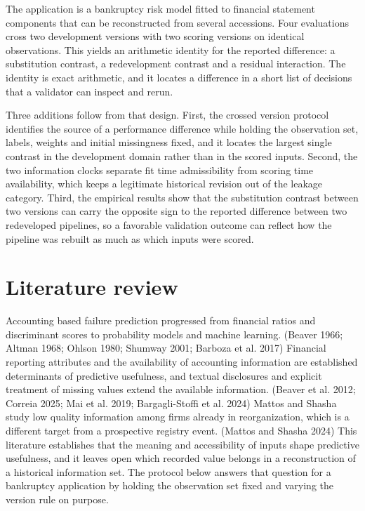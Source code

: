 \documentclass[10pt,a4paper,twocolumn]{article}
\begin{document}
The application is a bankruptcy risk model fitted to financial statement components that can be reconstructed from several accessions. Four evaluations cross two development versions with two scoring versions on identical observations. This yields an arithmetic identity for the reported difference: a substitution contrast, a redevelopment contrast and a residual interaction. The identity is exact arithmetic, and it locates a difference in a short list of decisions that a validator can inspect and rerun.

Three additions follow from that design. First, the crossed version protocol identifies the source of a performance difference while holding the observation set, labels, weights and initial missingness fixed, and it locates the largest single contrast in the development domain rather than in the scored inputs. Second, the two information clocks separate fit time admissibility from scoring time availability, which keeps a legitimate historical revision out of the leakage category. Third, the empirical results show that the substitution contrast between two versions can carry the opposite sign to the reported difference between two redeveloped pipelines, so a favorable validation outcome can reflect how the pipeline was rebuilt as much as which inputs were scored.
\section{Literature review}
Accounting based failure prediction progressed from financial ratios and discriminant scores to probability models and machine learning. (Beaver 1966; Altman 1968; Ohlson 1980; Shumway 2001; Barboza et al. 2017) Financial reporting attributes and the availability of accounting information are established determinants of predictive usefulness, and textual disclosures and explicit treatment of missing values extend the available information. (Beaver et al. 2012; Correia 2025; Mai et al. 2019; Bargagli-Stoffi et al. 2024) Mattos and Shasha study low quality information among firms already in reorganization, which is a different target from a prospective registry event. (Mattos and Shasha 2024) This literature establishes that the meaning and accessibility of inputs shape predictive usefulness, and it leaves open which recorded value belongs in a reconstruction of a historical information set. The protocol below answers that question for a bankruptcy application by holding the observation set fixed and varying the version rule on purpose.
\end{document}
